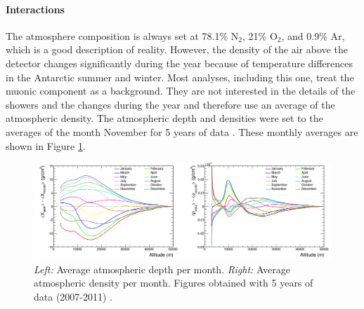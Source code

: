 \begin{table}[]
\centering
\caption{Best fit for parameters in Eq. \ref{eq:gaisser}. Numbers taken from Ref. \cite{Gaisser:2013bla}.}
\label{tab:fluxnormalization}
\end{table}

\paragraph{Interactions}
The atmosphere composition is always set at 78.1\% N$_2$, 21\% O$_2$, and 0.9\% Ar, which is a good description of reality. However, the density of the air above the detector changes significantly during the year because of temperature differences in the Antarctic summer and winter. Most analyses, including this one, treat the muonic component as a background. They are not interested in the details of the showers and the changes during the year and therefore use an average of the atmospheric density. The atmospheric depth and densities were set to the averages of the month November for 5 years of data \cite{samDeRidder}. These monthly averages are shown in Figure \ref{fig:atmosphere}.\\

\begin{figure}
\centering
\includegraphics[width=\textwidth]{chapter6/img/atmosphere.png}
\caption{\textit{Left: }Average atmospheric depth per month. \textit{Right: }Average atmospheric density per month. Figures obtained with 5 years of data (2007-2011) \cite{samDeRidder}.}
\label{fig:atmosphere}
\end{figure}


